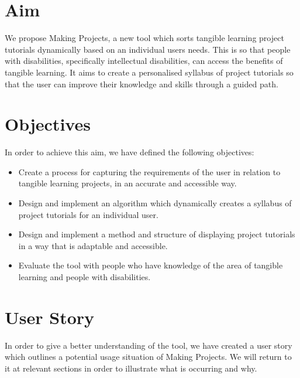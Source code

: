 \documentclass{l4proj}
\begin{document}
\section{Aim}
We propose Making Projects, a new tool which sorts tangible learning project tutorials dynamically based on an individual users needs. This is so that people with disabilities, specifically intellectual disabilities, can access the benefits of tangible learning. It aims to create a personalised syllabus of project tutorials so that the user can improve their knowledge and skills through a guided path. 

\section{Objectives}
In order to achieve this aim, we have defined the following objectives:
\begin{itemize}
    \item Create a process for capturing the requirements of the user in relation to tangible learning projects, in an accurate and accessible way.
    \item Design and implement an algorithm which dynamically creates a syllabus of project tutorials for an individual user. 
    \item Design and implement a method and structure of displaying project tutorials in a way that is adaptable and accessible. 
    \item Evaluate the tool with people who have knowledge of the area of tangible learning and people with disabilities. 
\end{itemize}

\section{User Story}
In order to give a better understanding of the tool, we have created a user story which outlines a potential usage situation of Making Projects. We will return to it at relevant sections in order to illustrate what is occurring and why. \\
\end{document}
